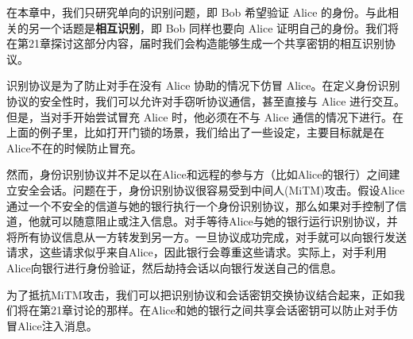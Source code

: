 \begin{snote}[单向证明与相互识别.]
在本章中，我们只研究单向的识别问题，即 Bob 希望验证 Alice 的身份。与此相关的另一个话题是\textbf{相互识别}，即 Bob 同样也要向 Alice 证明自己的身份。我们将在第21章探讨这部分内容，届时我们会构造能够生成一个共享密钥的相互识别协议。
\end{snote}

\begin{snote}[身份识别协议的安全性和局限性.]
识别协议是为了防止对手在没有 Alice 协助的情况下仿冒 Alice。在定义身份识别协议的安全性时，我们可以允许对手窃听协议通信，甚至直接与 Alice 进行交互。但是，当对手开始尝试冒充 Alice 时，他必须在不与 Alice 通信的情况下进行。在上面的例子里，比如打开门锁的场景，我们给出了一些设定，主要目标就是在Alice不在的时候防止冒充。

然而，身份识别协议并不足以在Alice和远程的参与方（比如Alice的银行）之间建立安全会话。问题在于，身份识别协议很容易受到中间人(MiTM)攻击。假设Alice通过一个不安全的信道与她的银行执行一个身份识别协议，那么如果对手控制了信道，他就可以随意阻止或注入信息。对手等待Alice与她的银行运行识别协议，并将所有协议信息从一方转发到另一方。一旦协议成功完成，对手就可以向银行发送请求，这些请求似乎来自Alice，因此银行会尊重这些请求。实际上，对手利用Alice向银行进行身份验证，然后劫持会话以向银行发送自己的信息。

为了抵抗MiTM攻击，我们可以把识别协议和会话密钥交换协议结合起来，正如我们将在第21章讨论的那样。在Alice和她的银行之间共享会话密钥可以防止对手仿冒Alice注入消息。	
\end{snote}










